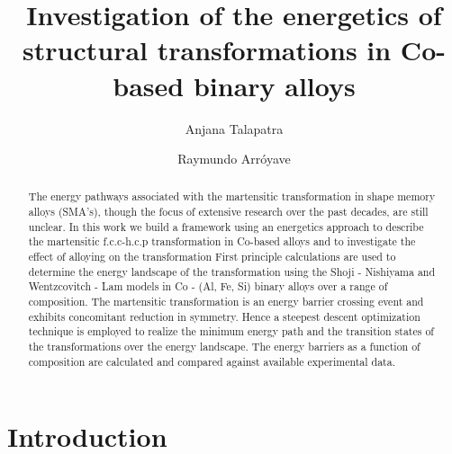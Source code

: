 \documentclass[preprint]{elsarticle}
\begin{document}
\begin{frontmatter}

\title{Investigation of the energetics of structural transformations in Co-based binary alloys }
 
\author[meen]{Anjana Talapatra}
\author[msen]{Raymundo Arr\'{o}yave}



\address[meen]{Department of Mechanical Engineering, Texas A$\&$M University, College Station, TX 77843-3123, United States}

\address[msen]{Department of Materials Science and Engineering , Texas A$\&$M University, College Station, TX 77843-3123, United States}

\begin{abstract}
The energy pathways associated with the martensitic transformation in shape memory alloys (SMA's), though the focus of extensive research over the past decades, are still unclear. In this work we build a framework using an energetics approach to describe the  martensitic  f.c.c-h.c.p transformation in Co-based alloys and to investigate the effect of alloying on the transformation  First principle calculations are used to determine the energy landscape of the transformation using the Shoji - Nishiyama and Wentzcovitch - Lam models in Co - (Al, Fe, Si) binary alloys over a range of composition. The martensitic transformation is an energy barrier crossing event and exhibits concomitant reduction in symmetry. Hence a steepest descent optimization technique is employed to realize the minimum energy path and the transition states of the transformations over the energy landscape. The energy barriers as a function of composition are  calculated  and compared against available  experimental data. 
\end{abstract}
\end{frontmatter}

\section{Introduction}
\label{Sec:intro}
\end{document}
